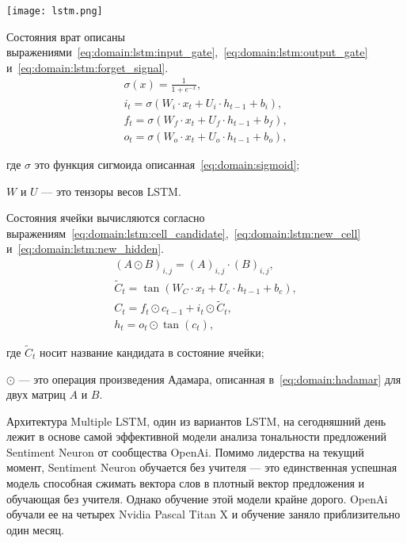 \begin{center}
  \texttt{[image: lstm.png]}
  \label{fig:domain:lstm}
\end{center}

Состояния врат описаны выражениями~\ref{eq:domain:lstm:input_gate},~\ref{eq:domain:lstm:output_gate} и~\ref{eq:domain:lstm:forget_signal}.
\begin{gather}
  \label{eq:domain:sigmoid}
  \sigma(x) = \frac{1}{1 + e^{-x}},\\
  \label{eq:domain:lstm:input_gate}
  i_t = \sigma(W_{i}\cdot{x_t} + U_{i}\cdot{h_{t-1}} + b_i),\\
  \label{eq:domain:lstm:forget_signal}
  f_t = \sigma(W_{f}\cdot{x_t} + U_{f}\cdot{h_{t-1}} + b_f),\\
  \label{eq:domain:lstm:output_gate}
  o_t = \sigma(W_{o}\cdot{x_t} + U_{o}\cdot{h_{t-1}} + b_o),
\end{gather}
\begin{explanationx}
\item [где] $\sigma$ это функция сигмоида описанная~\ref{eq:domain:sigmoid};
\item $W$ и $U$ --- это тензоры весов LSTM\@.
\end{explanationx}

Состояния ячейки вычисляются согласно выражениям~\ref{eq:domain:lstm:cell_candidate},~\ref{eq:domain:lstm:new_cell} и~\ref{eq:domain:lstm:new_hidden}.
\begin{gather}
  \label{eq:domain:hadamar}
  {(A\odot{B})}_{i,j} = {(A)}_{i,j}\cdot{{(B)}_{i,j}},\\
  \label{eq:domain:lstm:cell_candidate}
  \tilde{C}_t = \tan(W_{C}\cdot{x_{t}} + U_{c}\cdot{h_{t-1}} + b_c),\\
  \label{eq:domain:lstm:new_cell}
  C_t = f_t\odot{c_{t-1}} + i_t\odot{\tilde{C}_t},\\
  \label{eq:domain:lstm:new_hidden}
  h_t = o_t\odot{\tan(c_t)},
\end{gather}
\begin{explanationx}
\item [где] $\tilde{C}_t$ носит название кандидата в состояние ячейки;
\item ${\odot}$ --- это операция произведения Адамара, описанная в~\ref{eq:domain:hadamar} для двух матриц $A$ и $B$.
\end{explanationx}

Архитектура Multiple LSTM, один из вариантов LSTM, на сегодняшний день лежит в основе самой эффективной модели анализа тональности предложений Sentiment Neuron от сообщества OpenAi. Помимо лидерства на текущий момент, Sentiment Neuron обучается без учителя --- это единственная успешная модель способная сжимать вектора слов в плотный вектор предложения и обучающая без учителя. Однако обучение этой модели крайне дорого. OpenAi обучали ее на четырех Nvidia Pascal Titan X и обучение заняло приблизительно один месяц\cite{openai}.

